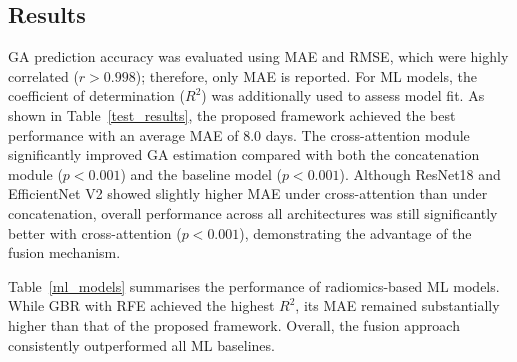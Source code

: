 

\subsection{Results}

GA prediction accuracy was evaluated using MAE and RMSE, which were highly correlated ($r > 0.998$); therefore, only MAE is reported. For ML models, the coefficient of determination ($R^2$) was additionally used to assess model fit. As shown in Table~\ref{test_results}, the proposed framework achieved the best performance with an average MAE of 8.0 days. The cross-attention module significantly improved GA estimation compared with both the concatenation module ($p < 0.001$) and the baseline model ($p < 0.001$). Although ResNet18 and EfficientNet V2 showed slightly higher MAE under cross-attention than under concatenation, overall performance across all architectures was still significantly better with cross-attention ($p < 0.001$), demonstrating the advantage of the fusion mechanism.

Table~\ref{ml_models} summarises the performance of radiomics-based ML models. While GBR with RFE achieved the highest $R^2$, its MAE remained substantially higher than that of the proposed framework. Overall, the fusion approach consistently outperformed all ML baselines.


